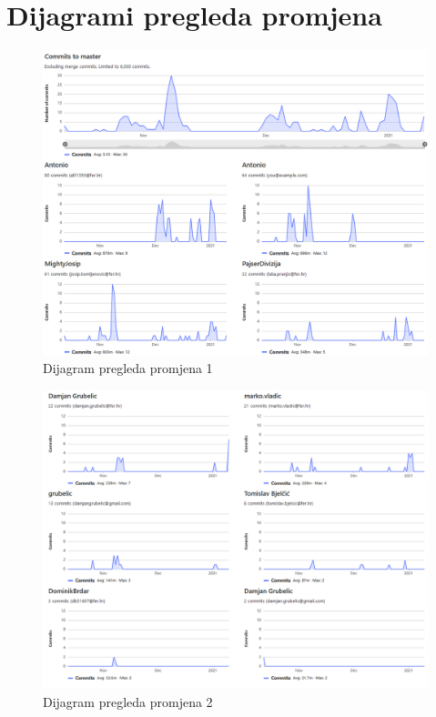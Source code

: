 		\section*{Dijagrami pregleda promjena}
			\begin{figure}[H]
				\centering
				\includegraphics[scale=0.5]{slike/DijagramPromjena1.png}
				\caption{Dijagram pregleda promjena 1}
				\label{fig:dij_pregled_promjena1}
			\end{figure}
			\begin{figure}[H]
				\centering
				\includegraphics[scale=0.5]{slike/DijagramPromjena2.png}
				\caption{Dijagram pregleda promjena 2}
				\label{fig:dij_pregled_promjena2}
			\end{figure}
			
	
